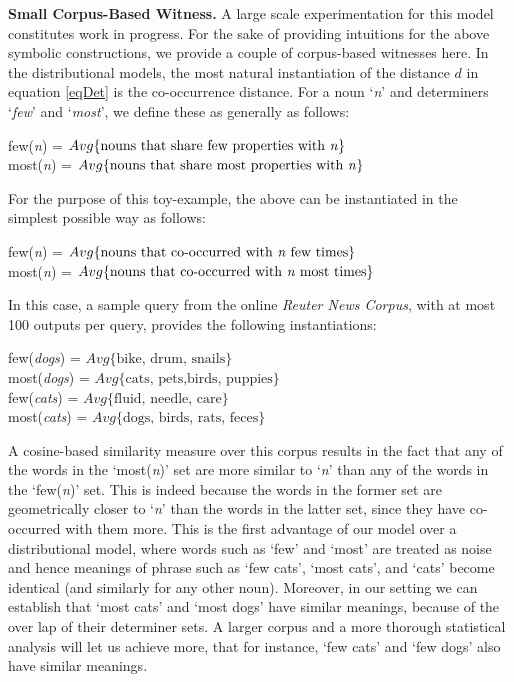\noindent
{\bf Small Corpus-Based Witness.} 
A large scale experimentation  for this model constitutes work in progress.  For the sake of providing  intuitions for the above symbolic constructions, we provide a couple of corpus-based witnesses here. In the distributional models, the most natural instantiation of the distance $d$  in equation \ref{eqDet} is the  co-occurrence distance. For a noun `\emph{n}' and determiners `\emph{few}' and `\emph{most}', we  define these as generally as follows:

\begin{center}
few(\emph{n}) = $Avg\{\mbox{nouns that share  few properties with \emph{n}}\}$\\
most(\emph{n}) = $Avg\{\mbox{nouns that share most properties  with \emph{n}}\}$
\end{center}

For the purpose of this toy-example, the above can be instantiated in the simplest possible way as follows:
\begin{center}
few(\emph{n}) = $Avg\{\mbox{nouns that co-occurred with  \emph{n} few times}\}$\\
most(\emph{n}) = $Avg\{\mbox{nouns that co-occurred with \emph{n} most times}\}$
\end{center}
In this case, a sample query from the online  \emph{Reuter News Corpus}, with at most 100 outputs per query,  provides the following instantiations:
\begin{center}
few(\emph{dogs}) = $Avg\{\mbox{bike, drum, snails}\}$\\
most(\emph{dogs}) = $Avg\{\mbox{cats, pets,birds, puppies}\}$\\
few(\emph{cats}) = $Avg\{\mbox{fluid, needle, care}\}$\\
most(\emph{cats}) = $Avg\{\mbox{dogs, birds, rats, feces}\}$\\
\end{center}
A cosine-based similarity measure over this corpus results in the fact that any of the words in the `most(\emph{n})' set are   more similar to `\emph{n}' than any of  the  words in the `few(\emph{n})' set. This is indeed because  the words in the former set are geometrically closer to `\emph{n}' than the words in the latter set, since they have co-occurred with them more.  This is the first advantage of our model over  a distributional model, where words such as `few' and `most' are treated as  {noise} and hence meanings of phrase such as `few cats', `most cats', and `cats'  become  identical (and similarly for any other noun). Moreover, in our setting we can establish that `most cats' and `most dogs' have similar meanings, because of the over lap of their determiner sets. A larger corpus and a more thorough statistical analysis  will let us achieve more,  that for instance,   `few cats' and `few dogs' also have similar meanings. 


